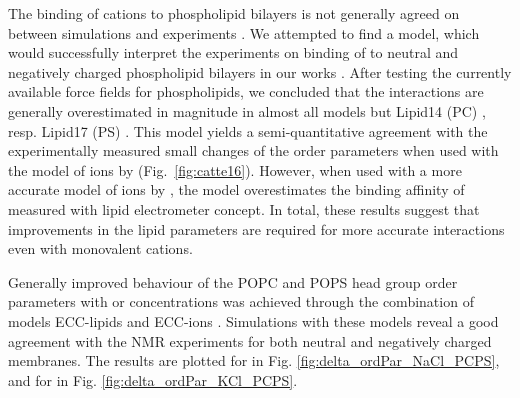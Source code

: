 \documentclass[journal=jpcbfk,manuscript=article]{achemso}
\begin{document}

The binding of  cations to phospholipid bilayers 
is not generally agreed on between simulations 
\citep{bockmann03,sachs04,berkowitz06,cordomi09}
and experiments 
\citep{cevc90,tocanne90,hauser76,herbette84,uhrikova08}.
We attempted to find a model, 
which would successfully interpret the experiments on binding of 
to neutral and negatively charged phospholipid bilayers \citep{akutsu81, roux90} 
in our works \citep{catte16, nmrlipids_proj4}.
After testing the currently available force fields for phospholipids,
we concluded
that the interactions are generally overestimated in magnitude in almost all models 
but Lipid14 (PC) \citep{dickson14}, resp. Lipid17 (PS) \citep{lipid17-future}. 
This model yields a semi-quantitative agreement with the experimentally measured small changes of the order parameters 
when used with the model of ions by \citet{aqvist90} (Fig.~\ref{fig:catte16}). 
However, when used with a more accurate model of ions by \citet{Pluharova2014, martinek17},
the model overestimates the binding affinity of 
measured with lipid electrometer concept. \citep{melcr18}
In total, these results suggest that improvements 
in the lipid parameters are required for more accurate interactions even with monovalent cations. 
\citep{catte16, melcr18, nmrlipids_proj4}

Generally improved behaviour 
of the POPC and POPS head group order parameters 
with  or  concentrations 
was achieved through the combination of models 
ECC-lipids \citep{melcr18} and ECC-ions \citep{martinek17, kohagen16, Pluharova2014}. 
Simulations with these models 
reveal a good agreement with the NMR experiments 
for both neutral and negatively charged membranes.
The results are plotted for  in Fig. \ref{fig:delta_ordPar_NaCl_PCPS}, 
and for  in Fig. \ref{fig:delta_ordPar_KCl_PCPS}. 
\end{document}
